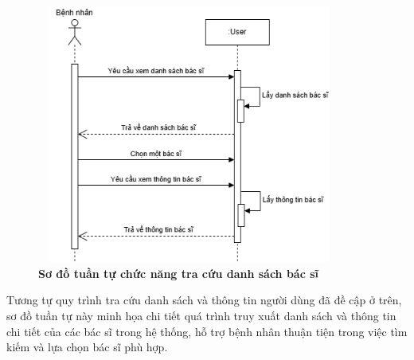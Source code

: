 \begin{figure}[H]
	\centering
	\includegraphics[width=10cm,height=8.5cm]{Images/sequence/user/getDoctorByPatient.drawio.png}
	\caption[Sơ đồ tuần tự chức năng tra cứu danh sách bác sĩ]{\bfseries \fontsize{12pt}{0pt}
		\selectfont Sơ đồ tuần tự chức năng tra cứu danh sách bác sĩ}
	\label{sequence_get_all_doctor} %
\end{figure}
Tương tự quy trình tra cứu danh sách và thông tin người dùng đã đề cập ở trên, sơ đồ tuần tự này minh họa chi tiết quá trình truy xuất danh sách
và thông tin chi tiết của các bác sĩ trong hệ thống, hỗ trợ bệnh nhân thuận tiện trong việc tìm kiếm và lựa chọn bác sĩ phù hợp.

